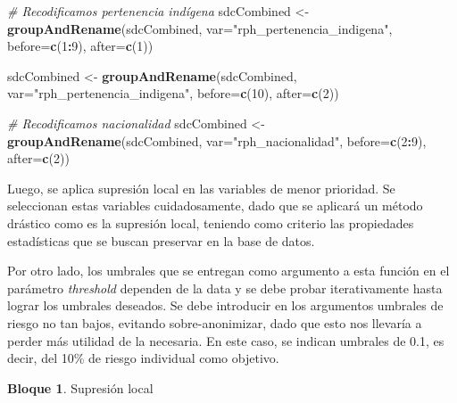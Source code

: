\documentclass[]{book}
\newenvironment{Shaded}{\begin{snugshade}}{\end{snugshade}}
\newcommand{\CommentTok}[1]{\textcolor[rgb]{0.56,0.35,0.01}{\textit{#1}}}
\newcommand{\DataTypeTok}[1]{\textcolor[rgb]{0.13,0.29,0.53}{#1}}
\newcommand{\DecValTok}[1]{\textcolor[rgb]{0.00,0.00,0.81}{#1}}
\newcommand{\KeywordTok}[1]{\textcolor[rgb]{0.13,0.29,0.53}{\textbf{#1}}}
\newcommand{\NormalTok}[1]{#1}
\newcommand{\OperatorTok}[1]{\textcolor[rgb]{0.81,0.36,0.00}{\textbf{#1}}}
\newcommand{\StringTok}[1]{\textcolor[rgb]{0.31,0.60,0.02}{#1}}
\theoremstyle{definition}
\theoremstyle{definition}
\newtheorem{example}{Bloque}[chapter]
\theoremstyle{definition}
\theoremstyle{definition}
\theoremstyle{remark}
\begin{document}
\begin{Shaded}
\begin{Highlighting}[]
\CommentTok{# Recodificamos pertenencia indígena}
\NormalTok{sdcCombined <-}\StringTok{ }\KeywordTok{groupAndRename}\NormalTok{(sdcCombined, }\DataTypeTok{var=}\StringTok{"rph_pertenencia_indigena"}\NormalTok{,}
                              \DataTypeTok{before=}\KeywordTok{c}\NormalTok{(}\DecValTok{1}\OperatorTok{:}\DecValTok{9}\NormalTok{), }\DataTypeTok{after=}\KeywordTok{c}\NormalTok{(}\DecValTok{1}\NormalTok{))}

\NormalTok{sdcCombined <-}\StringTok{ }\KeywordTok{groupAndRename}\NormalTok{(sdcCombined, }\DataTypeTok{var=}\StringTok{"rph_pertenencia_indigena"}\NormalTok{,}
                              \DataTypeTok{before=}\KeywordTok{c}\NormalTok{(}\DecValTok{10}\NormalTok{), }\DataTypeTok{after=}\KeywordTok{c}\NormalTok{(}\DecValTok{2}\NormalTok{))}

\CommentTok{# Recodificamos nacionalidad}
\NormalTok{sdcCombined <-}\StringTok{ }\KeywordTok{groupAndRename}\NormalTok{(sdcCombined, }\DataTypeTok{var=}\StringTok{"rph_nacionalidad"}\NormalTok{,}
                              \DataTypeTok{before=}\KeywordTok{c}\NormalTok{(}\DecValTok{2}\OperatorTok{:}\DecValTok{9}\NormalTok{), }\DataTypeTok{after=}\KeywordTok{c}\NormalTok{(}\DecValTok{2}\NormalTok{))}
\end{Highlighting}
\end{Shaded}

Luego, se aplica supresión local en las variables de menor prioridad. Se seleccionan estas variables cuidadosamente, dado que se aplicará un método drástico como es la supresión local, teniendo como criterio las propiedades estadísticas que se buscan preservar en la base de datos.

Por otro lado, los umbrales que se entregan como argumento a esta función en el parámetro \emph{threshold} dependen de la data y se debe probar iterativamente hasta lograr los umbrales deseados. Se debe introducir en los argumentos umbrales de riesgo no tan bajos, evitando sobre-anonimizar, dado que esto nos llevaría a perder más utilidad de la necesaria. En este caso, se indican umbrales de 0.1, es decir, del 10\% de riesgo individual como objetivo.

\begin{example}
\protect\hypertarget{exm:bloque65nbm}{}{\label{exm:bloque65nbm} }Supresión local
\end{example}
\end{document}
